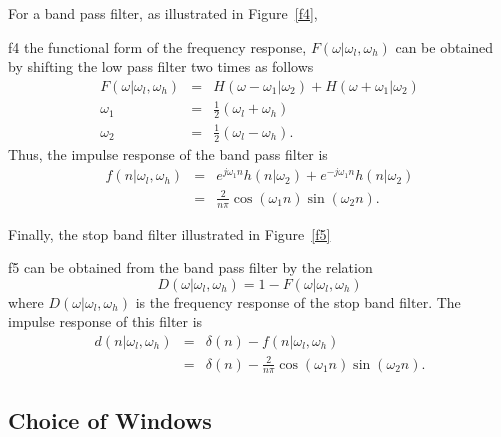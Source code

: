 For a band pass filter, as illustrated in 
Figure~\ref{f4},
%

{f4}
%
the functional form of the frequency response,
$F(\omega|\omega_l,\omega_h)$ can be obtained by shifting the
low pass filter two times as follows
%
\begin{eqnarray}
F(\omega|\omega_l,\omega_h) &=& H(\omega-\omega_1|\omega_2)+H(\omega+\omega_1|\omega_2)\\
                  \omega_1  &=& \frac{1}{2}(\omega_l+\omega_h)\\
                  \omega_2  &=& \frac{1}{2}(\omega_l-\omega_h).
\label{e7}
\end{eqnarray}
%
Thus, the impulse response of the band pass filter is
%
\begin{eqnarray}
f(n|\omega_l,\omega_h) &=& e^{j\omega_1n}h(n|\omega_2)+e^{-j\omega_1n}h(n|\omega_2) \\
                       &=& \frac{2}{n\pi}\cos(\omega_1n)\sin(\omega_2n).
\label{e8}
\end{eqnarray}
%

	Finally, the stop band filter illustrated in Figure~\ref{f5}
%

{f5}
%
can be obtained from the band pass filter by the relation
%
\begin{equation}
D(\omega|\omega_l,\omega_h)=1-F(\omega|\omega_l,\omega_h)
\label{e9}
\end{equation}
%
where $D(\omega|\omega_l,\omega_h)$ is the frequency response of the stop
band filter.  The impulse response of this filter is
%
\begin{eqnarray}
d(n|\omega_l,\omega_h) &=& \delta(n)-f(n|\omega_l,\omega_h) \\
                       &=& \delta(n)-\frac{2}{n\pi}\cos(\omega_1n)\sin(\omega_2n).
\label{e10}
\end{eqnarray}
%
\subsection{Choice of Windows}
\label{s3}

